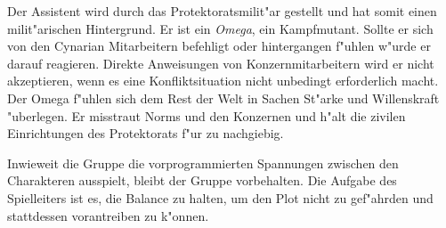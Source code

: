 Der Assistent wird durch das Protektoratsmilit"ar gestellt und hat somit einen milit"arischen Hintergrund. Er ist ein \emph{Omega}, ein Kampfmutant. Sollte er sich von den Cynarian Mitarbeitern befehligt oder hintergangen f"uhlen w"urde er darauf reagieren. Direkte Anweisungen von Konzernmitarbeitern wird er nicht akzeptieren, wenn es eine Konfliktsituation nicht unbedingt erforderlich macht. Der Omega f"uhlen sich dem Rest der Welt in Sachen St"arke und Willenskraft "uberlegen. Er misstraut Norms und den Konzernen und h"alt die zivilen Einrichtungen des Protektorats f"ur zu nachgiebig.

Inwieweit die Gruppe die vorprogrammierten Spannungen zwischen den Charakteren ausspielt, bleibt der Gruppe vorbehalten. Die Aufgabe des Spielleiters ist es, die Balance zu halten, um den Plot nicht zu gef"ahrden und stattdessen vorantreiben zu k"onnen. 